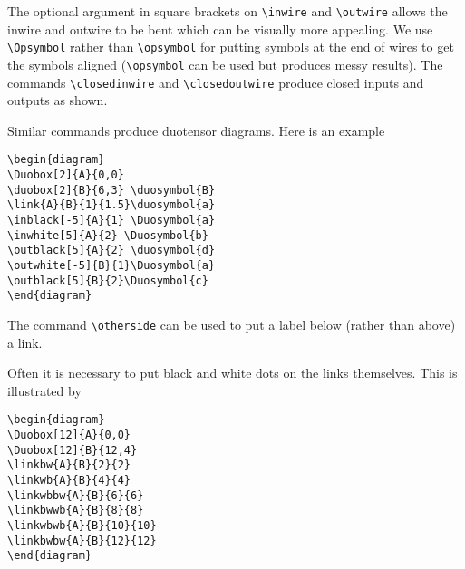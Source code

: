 \documentclass[10pt]{article}
\begin{document}
\noindent The optional argument in square brackets on \verb+\inwire+ and \verb+\outwire+ allows the inwire and outwire to be bent which can be visually more appealing.  We use \verb+\Opsymbol+ rather than \verb+\opsymbol+ for putting symbols at the end of wires to get the symbols aligned (\verb+\opsymbol+ can be used but produces messy results).  The commands \verb+\closedinwire+ and \verb+\closedoutwire+ produce closed inputs and outputs as shown.

Similar commands produce duotensor diagrams.  Here is an example
\begin{verbatim}
\begin{diagram}
\Duobox[2]{A}{0,0}
\duobox[2]{B}{6,3} \duosymbol{B}
\link{A}{B}{1}{1.5}\duosymbol{a}
\inblack[-5]{A}{1} \Duosymbol{a}
\inwhite[5]{A}{2} \Duosymbol{b}
\outblack[5]{A}{2} \duosymbol{d}
\outwhite[-5]{B}{1}\Duosymbol{a}
\outblack[5]{B}{2}\Duosymbol{c}
\end{diagram}
\end{verbatim}

The command \verb+\otherside+ can be used to put a label below (rather than above) a link.

\newpage

Often it is necessary to put black and white dots on the links themselves.  This is illustrated by
\begin{verbatim}
\begin{diagram}
\Duobox[12]{A}{0,0}
\Duobox[12]{B}{12,4}
\linkbw{A}{B}{2}{2}
\linkwb{A}{B}{4}{4}
\linkwbbw{A}{B}{6}{6}
\linkbwwb{A}{B}{8}{8}
\linkwbwb{A}{B}{10}{10}
\linkbwbw{A}{B}{12}{12}
\end{diagram}
\end{verbatim}
\end{document}

